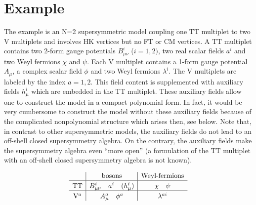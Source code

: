 \documentclass[a4paper,12pt]{article}
\begin{document}
\section{Example}\label{bra-example}

The example is an N=2 supersymmetric
model coupling one TT multiplet to two V multiplets
and involves HK vertices but no FT or CM vertices.
A TT multiplet contains two 2-form gauge potentials
$B_{\mu\nu}^i$ ($i=1,2)$, two real scalar fields $a^i$
and two Weyl fermions $\chi$ and $\psi$.
Each V multiplet contains a 1-form gauge potential
$A_\mu$, a complex scalar field $\phi$ and two
Weyl fermions $\lambda^i$. The V multiplets are
labeled by the index $a=1,2$. This
field content is supplemented with auxiliary fields $h_\mu^i$
which are embedded in the TT multiplet.
These auxiliary fields allow one to construct the model
in a compact polynomial form.
In fact, it would be very cumbersome to construct
the model without these auxiliary fields because
of the complicated nonpolynomial structure which arises then,
see below. 
Note that, in contrast to other supersymmetric
models, the auxiliary fields do not lead to an
off-shell closed supersymmetry algebra. On the contrary,
the auxiliary fields make the supersymmetry algebra
even ``more open'' (a formulation of the TT multiplet
with an off-shell closed supersymmetry algebra is not
known).

\[
\begin{array}{c|c|c}
& \mbox{bosons} & \mbox{Weyl-fermions} 
\\
\hline\rule{0em}{2.5ex}
\mbox{{TT}}& {B_{\mu\nu}^i}\quad a^i\quad 
({h_\mu^i}) &  \chi\quad \psi
\\
\hline\rule{0em}{2.5ex}
\mbox{{V$^a$}}& {A_\mu^a}\quad \phi^a &
\lambda^{ai}
\end{array}
\]
\end{document}
